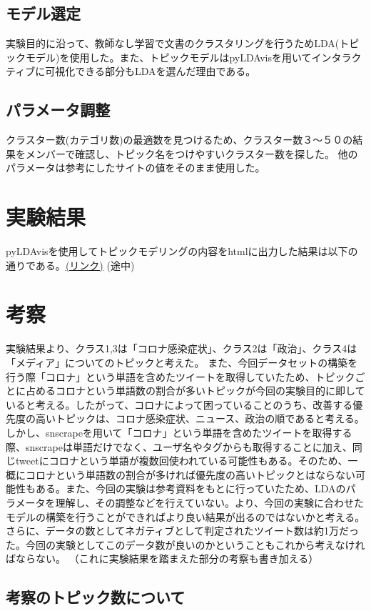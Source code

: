 \documentclass[a4paper, 11pt, titlepage]{jsarticle}
\begin{document}
\subsection{モデル選定}
実験目的に沿って、教師なし学習で文書のクラスタリングを行うためLDA(トピックモデル)を使用した。また、トピックモデルはpyLDAvisを用いてインタラクティブに可視化できる部分もLDAを選んだ理由である。 

\subsection{パラメータ調整}
クラスター数(カテゴリ数)の最適数を見つけるため、クラスター数３〜５０の結果をメンバーで確認し、トピック名をつけやすいクラスター数を探した。
他のパラメータは参考にしたサイトの値をそのまま使用した\cite{LDA}。

\section{実験結果}
pyLDAvisを使用してトピックモデリングの内容をhtmlに出力した結果は以下の通りである。\href{https://ie.u-ryukyu.ac.jp/~e205759/pyldavis_output.html}{(リンク)}
(途中)


\section{考察}
実験結果より、クラス1,3は「コロナ感染症状」、クラス2は「政治」、クラス4は「メディア」についてのトピックと考えた。
また、今回データセットの構築を行う際「コロナ」という単語を含めたツイートを取得していたため、トピックごとに占めるコロナという単語数の割合が多いトピックが今回の実験目的に即していると考える。したがって、コロナによって困っていることのうち、改善する優先度の高いトピックは、コロナ感染症状、ニュース、政治の順であると考える。
しかし、snscrapeを用いて「コロナ」という単語を含めたツイートを取得する際、snscrapeは単語だけでなく、ユーザ名やタグからも取得することに加え、同じtweetにコロナという単語が複数回使われている可能性もある。そのため、一概にコロナという単語数の割合が多ければ優先度の高いトピックとはならない可能性もある。また、今回の実験は参考資料をもとに行っていたため、LDAのパラメータを理解し、その調整などを行えていない。より、今回の実験に合わせたモデルの構築を行うことができればより良い結果が出るのではないかと考える。
さらに、データの数としてネガティブとして判定されたツイート数は約1万だった。今回の実験としてこのデータ数が良いのかということもこれから考えなければならない。
（これに実験結果を踏まえた部分の考察も書き加える）

\subsection{考察のトピック数について}
\end{document}
